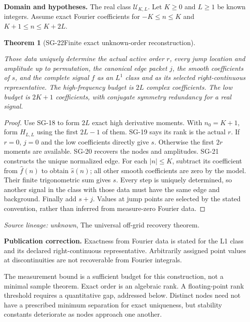 \documentclass[11pt]{article}
\newtheorem{theorem}{Theorem}[section]
\theoremstyle{definition}\newtheorem{definition}[theorem]{Definition}
\theoremstyle{remark}\newtheorem{remark}[theorem]{Remark}
\begin{document}
\par{\small\textbf{Domain and hypotheses.} The real class $\mathcal U_{K,L}$. Let $K\ge0$ and $L\ge1$ be known integers. Assume exact Fourier coefficients for $-K\le n\le K$ and $K+1\le n\le K+2L$.}\par
\begin{theorem}[SG-22\quad Finite exact unknown-order reconstruction]\label{SG-22}

Those data uniquely determine the actual active order $r$, every jump
location and amplitude up to permutation, the canonical edge packet $j$,
the smooth coefficients of $s$, and the complete signal $f$ as an $L^1$ class
and as its selected right-continuous representative. The high-frequency
budget is $2L$ complex coefficients. The low budget is $2K+1$ coefficients,
with conjugate symmetry redundancy for a real signal.

\end{theorem}
\begin{proof}

Use SG-18 to form $2L$ exact high derivative moments. With $n_0=K+1$,
form $H_{L,L}$ using the first $2L-1$ of them. SG-19 says its rank is the
actual $r$. If $r=0$, $j=0$ and the low coefficients directly give $s$.
Otherwise the first $2r$ moments are available. SG-20 recovers the nodes and
amplitudes. SG-21 constructs the unique normalized edge.
For each $|n|\le K$, subtract its coefficient from $\widehat f(n)$ to obtain
$\widehat s(n)$; all other smooth coefficients are zero by the model.
Their finite trigonometric sum gives $s$. Every step is uniquely determined,
so another signal in the class with those data must have the same edge and
background. Finally add $s+j$. Values at jump points are selected by the
stated convention, rather than inferred from measure-zero Fourier data.

\end{proof}

\par{\small\color{Teal}\textit{Source lineage:} \textit{unknown}, The universal off-grid recovery theorem.}\par

\par{\small\textbf{Publication correction.} Exactness from Fourier data is stated for the L1 class and its declared right-continuous representative. Arbitrarily assigned point values at discontinuities are not recoverable from Fourier integrals.}\par


The measurement bound is a sufficient budget for this construction, not a
minimal sample theorem. Exact order is an algebraic rank. A floating-point
rank threshold requires a quantitative gap, addressed below. Distinct nodes
need not have a prescribed minimum separation for exact uniqueness, but
stability constants deteriorate as nodes approach one another.
\end{document}
